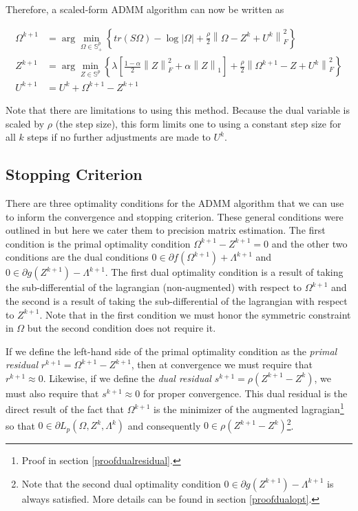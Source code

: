 \documentclass[11pt,]{report}
\theoremstyle{definition}
\theoremstyle{definition}
\theoremstyle{definition}
\theoremstyle{remark}
\begin{document}
Therefore, a scaled-form ADMM algorithm can now be written as

\begin{equation}
\begin{split}
  \Omega^{k + 1} &= \arg\min_{\Omega \in \mathbb{S}_{+}^{p}}\left\{ tr\left(S\Omega\right) - \log\left|\Omega\right| + \frac{\rho}{2}\left\| \Omega - Z^{k} + U^{k} \right\|_{F}^{2} \right\} \\
  Z^{k + 1} &= \arg\min_{Z \in \mathbb{S}^{p}}\left\{ \lambda\left[ \frac{1 - \alpha}{2}\left\| Z \right\|_{F}^{2} + \alpha\left\| Z \right\|_{1} \right] + \frac{\rho}{2}\left\| \Omega^{k + 1} - Z + U^{k} \right\|_{F}^{2} \right\} \\
  U^{k + 1} &= U^{k} + \Omega^{k + 1} - Z^{k + 1}
\label{eq:ADMMscaled}
\end{split}
\end{equation}

Note that there are limitations to using this method. Because the dual variable is scaled by \(\rho\) (the step size), this form limits one to using a constant step size for all \(k\) steps if no further adjustments are made to \(U^{k}\).

\hypertarget{ADMMstop}{%
\subsection{Stopping Criterion}\label{ADMMstop}}

There are three optimality conditions for the ADMM algorithm that we can use to inform the convergence and stopping criterion. These general conditions were outlined in \citet{boyd2011distributed} but here we cater them to precision matrix estimation. The first condition is the primal optimality condition \(\Omega^{k + 1} - Z^{k + 1} = 0\) and the other two conditions are the dual conditions \(0 \in \partial f\left(\Omega^{k + 1}\right) + \Lambda^{k + 1}\) and \(0 \in \partial g\left(Z^{k + 1}\right) - \Lambda^{k + 1}\). The first dual optimality condition is a result of taking the sub-differential of the lagrangian (non-augmented) with respect to \(\Omega^{k + 1}\) and the second is a result of taking the sub-differential of the lagrangian with respect to \(Z^{k + 1}\). Note that in the first condition we must honor the symmetric constraint in \(\Omega\) but the second condition does not require it.

If we define the left-hand side of the primal optimality condition as the \emph{primal residual} \(r^{k + 1} = \Omega^{k + 1} - Z^{k + 1}\), then at convergence we must require that \(r^{k + 1} \approx 0\). Likewise, if we define the \emph{dual residual} \(s^{k + 1} = \rho\left( Z^{k + 1} - Z^{k} \right)\), we must also require that \(s^{k + 1} \approx 0\) for proper convergence. This dual residual is the direct result of the fact that \(\Omega^{k + 1}\) is the minimizer of the augmented lagragian\footnote{Proof in section \ref{proofdualresidual}.} so that \(0 \in \partial L_{p}\left( \Omega, Z^{k}, \Lambda^{k} \right)\) and consequently \(0 \in \rho\left( Z^{k + 1} - Z^{k} \right)\)\footnote{Note that the second dual optimality condition \(0 \in \partial g\left(Z^{k + 1}\right) - \Lambda^{k + 1}\) is always satisfied. More details can be found in section \ref{proofdualopt}.}.
\end{document}
